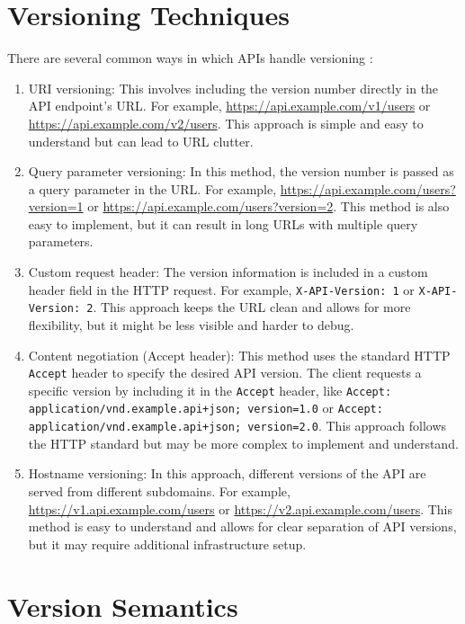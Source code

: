 \documentclass{article}
\begin{document}
\section{Versioning Techniques}

There are several common ways in which APIs handle versioning \cite{DesigningWebAPIs}:

\begin{enumerate}
    \item URI versioning: This involves including the version number directly in the API endpoint's URL. For example, \url{https://api.example.com/v1/users} or \url{https://api.example.com/v2/users}. This approach is simple and easy to understand but can lead to URL clutter.
    \item Query parameter versioning: In this method, the version number is passed as a query parameter in the URL. For example, \url{https://api.example.com/users?version=1} or \url{https://api.example.com/users?version=2}. This method is also easy to implement, but it can result in long URLs with multiple query parameters.
    \item Custom request header: The version information is included in a custom header field in the HTTP request. For example, \texttt{X-API-Version: 1} or \texttt{X-API-Version: 2}. This approach keeps the URL clean and allows for more flexibility, but it might be less visible and harder to debug.
    \item Content negotiation (Accept header): This method uses the standard HTTP \texttt{Accept} header to specify the desired API version. The client requests a specific version by including it in the \texttt{Accept} header, like \texttt{Accept: application/vnd.example.api+json; version=1.0} or \texttt{Accept: application/vnd.example.api+json; version=2.0}. This approach follows the HTTP standard but may be more complex to implement and understand.
    \item Hostname versioning: In this approach, different versions of the API are served from different subdomains. For example, \url{https://v1.api.example.com/users} or \url{https://v2.api.example.com/users}. This method is easy to understand and allows for clear separation of API versions, but it may require additional infrastructure setup.
\end{enumerate}

\section{Version Semantics}
\end{document}
